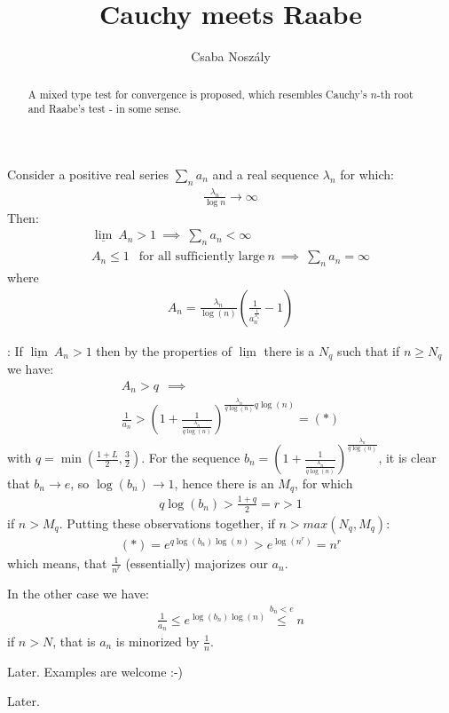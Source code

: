 \documentclass{article}
\author{Csaba Noszály}
\title{Cauchy meets Raabe}
\begin{document}
\maketitle

\begin{abstract}
	A mixed type test for convergence is proposed, which resembles Cauchy's $n$-th root and Raabe's test - in some sense.
\end{abstract}


\vspace{0.2cm}
\newline
\noindent Consider a positive real series $\sum_n a_n$ and a real sequence $\lambda_n$ for which:
\begin{gather*}
\frac{\lambda_n}{\log{n}}\to \infty
\end{gather*}
Then:
\begin{gather*}
{\underline{\lim}}~ A_n >1 \ \implies \ \sum_n a_n< \infty \\
A_n \le 1 \ \ \text{ for all sufficiently large} \ n \ \implies \ \sum_n a_n= \infty
\end{gather*}
where
\begin{gather*}
A_n= \frac{\lambda_n}{\log(n)}\left(\frac{1}{a_n^{\frac{1}{\lambda_n}}}-1\right)
\end{gather*}


\vspace{0.2cm}
: 
\newline If ${\underline{\lim}}~ A_n>1$ then by the properties of $\underline{\lim}$ there is a $N_q$ such that if $n\ge N_q$ we have:
\begin{gather*}
	A_n > q\ \ \implies \\
    \frac{1}{a_n}> \left( 1 + \frac{1}{\frac{\lambda_n}{q\log(n)}}\right)^{\frac{\lambda_n}{q\log(n)} q\log(n)}=(*)
\end{gather*}
with $q=\min(\frac{1+L}{2},\frac{3}{2})$. For the sequence $b_n=\left( 1 + \frac{1}{\frac{\lambda_n}{q\log(n)}}\right)^{\frac{\lambda_n}{q\log(n)}}$, it is clear 
	that $b_n \to e$, so $\log(b_n)\to 1$, hence there is an $M_q$, for which
\begin{gather*}
	q\log(b_n) > \frac{1+q}{2}=r>1
\end{gather*}
if $n>M_q$. Putting these observations together, if $n>max(N_q,M_q)$:
\begin{gather*}
(*)=e^{q\log(b_n) \log(n)} > e^{\log(n^r)}=n^r
\end{gather*}
which means, that $\frac{1}{n^r}$ (essentially) majorizes our $a_n$.


\vspace{0.2cm}
\noindent In the other case we have:
\begin{gather*}
    \frac{1}{a_n} \le e^{\log(b_n) \log(n)} \stackrel{{b_n<e}}{\le} n
\end{gather*}
if $n>N$, that is $a_n$ is minorized by $\frac{1}{n}$.

\vspace{0.2cm}
\par\noindent Later. Examples are welcome :-)


\vspace{0.2cm}
\par\noindent Later.
\end{document}
